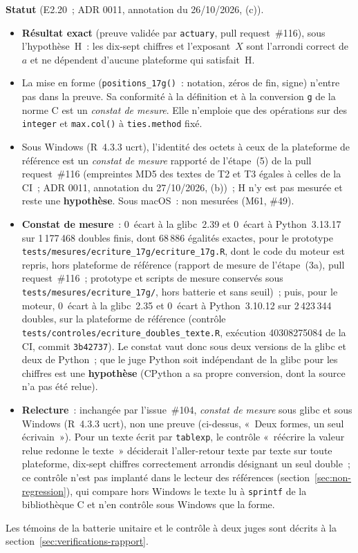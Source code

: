 \documentclass[a4paper,11pt]{article}
\newcommand{\code}[1]{\texttt{\small #1}}
\begin{document}
\medskip
\noindent
\textbf{Statut} (E2.20~; ADR 0011, annotation du 26/10/2026, (c)).
\begin{itemize}[leftmargin=*, itemsep=2pt]
  \item \textbf{Résultat exact} (preuve validée par \code{actuary}, pull
    request~\#116), sous l'hypothèse~H~: les dix-sept chiffres et
    l'exposant~$X$ sont l'arrondi correct de~$a$ et ne dépendent d'aucune
    plateforme qui satisfait~H.
  \item La mise en forme (\code{positions\_17g()}~: notation, zéros de fin,
    signe) n'entre pas dans la preuve. Sa conformité à la définition et à la
    conversion \code{g} de la norme C est un \emph{constat de mesure}. Elle
    n'emploie que des opérations sur des \code{integer} et \code{max.col()}
    à \code{ties.method} fixé.
  \item Sous Windows (R~4.3.3 ucrt), l'identité des octets à ceux de la
    plateforme de référence est un \emph{constat de mesure} rapporté de
    l'étape~(5) de la pull request~\#116 (empreintes MD5 des textes de T2
    et T3 égales à celles de la CI~; ADR 0011, annotation du 27/10/2026,
    (b))~; H n'y est pas mesurée et reste une \textbf{hypothèse}. Sous
    macOS~: non mesurées (M61, \#49).
  \item \textbf{Constat de mesure}~: 0~écart à la glibc~2.39 et 0~écart à
    Python~3.13.17 sur 1\,177\,468 doubles finis, dont 68\,886 égalités
    exactes, pour le prototype
    \code{tests/mesures/ecriture\_17g/ecriture\_17g.R}, dont le code du
    moteur est repris, hors plateforme de référence (rapport de mesure de
    l'étape~(3a), pull request~\#116~; prototype et scripts de mesure
    conservés sous \code{tests/mesures/ecriture\_17g/}, hors batterie et
    sans seuil)~; puis, pour le moteur, 0~écart à la
    glibc~2.35 et 0~écart à Python~3.10.12 sur 2\,423\,344 doubles, sur la
    plateforme de référence (contrôle
    \code{tests/controles/ecriture\_doubles\_texte.R}, exécution
    40308275084 de la CI, commit \code{3b42737}). Le constat vaut donc sous
    deux versions de la glibc et deux de Python~; que le juge Python soit
    indépendant de la glibc pour les chiffres est une \textbf{hypothèse}
    (CPython a sa propre conversion, dont la source n'a pas été relue).
  \item \textbf{Relecture}~: inchangée par l'issue~\#104, \emph{constat de
    mesure} sous glibc et sous Windows (R~4.3.3 ucrt), non une preuve
    (ci-dessus, «~Deux formes, un seul écrivain~»). Pour un texte écrit par \code{tablexp}, le contrôle
    «~réécrire la valeur relue redonne le texte~» déciderait l'aller-retour
    texte par texte sur toute plateforme, dix-sept chiffres correctement
    arrondis désignant un seul double~; ce contrôle n'est pas implanté dans
    le lecteur des références (section~\ref{sec:non-regression}), qui
    compare hors Windows le texte lu à \code{sprintf} de la bibliothèque C
    et n'en contrôle sous Windows que la forme.
\end{itemize}
Les témoins de la batterie unitaire et le contrôle à deux juges sont décrits
à la section~\ref{sec:verifications-rapport}.
\end{document}
